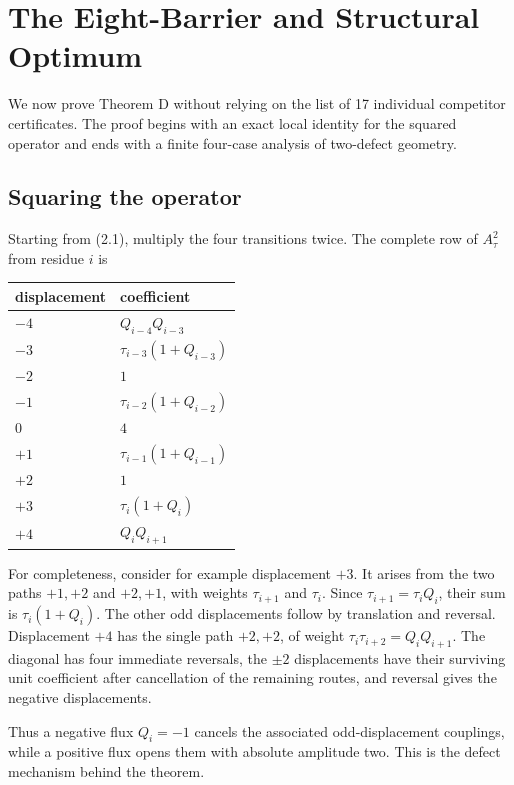 \section{The Eight-Barrier and Structural Optimum}

We now prove Theorem D without relying on the list of 17 individual
competitor certificates. The proof begins with an exact local identity for the
squared operator and ends with a finite four-case analysis of two-defect
geometry.

\subsection{Squaring the operator}

Starting from (2.1), multiply the four transitions twice. The complete row of
\(A_\tau^2\) from residue \(i\) is

\begin{center}
\begin{tabular}{ll}
\toprule
displacement & coefficient \\
\midrule
\(-4\) & \(Q_{i-4}Q_{i-3}\) \\
\(-3\) & \(\tau_{i-3}(1+Q_{i-3})\) \\
\(-2\) & \(1\) \\
\(-1\) & \(\tau_{i-2}(1+Q_{i-2})\) \\
\(0\) & \(4\) \\
\(+1\) & \(\tau_{i-1}(1+Q_{i-1})\) \\
\(+2\) & \(1\) \\
\(+3\) & \(\tau_i(1+Q_i)\) \\
\(+4\) & \(Q_iQ_{i+1}\) \\
\bottomrule
\end{tabular}%
\end{center}

For completeness, consider for example displacement \(+3\). It arises from the
two paths \(+1,+2\) and \(+2,+1\), with weights \(\tau_{i+1}\) and \(\tau_i\).
Since \(\tau_{i+1}=\tau_i Q_i\), their sum is \(\tau_i(1+Q_i)\). The other odd
displacements follow by translation and reversal. Displacement \(+4\) has the
single path \(+2,+2\), of weight \(\tau_i \tau_{i+2}=Q_iQ_{i+1}\). The diagonal
has four immediate reversals, the \(\pm 2\) displacements have their surviving
unit coefficient after cancellation of the remaining routes, and reversal
gives the negative displacements.

Thus a negative flux \(Q_i=-1\) cancels the associated odd-displacement
couplings, while a positive flux opens them with absolute amplitude two. This
is the defect mechanism behind the theorem.

